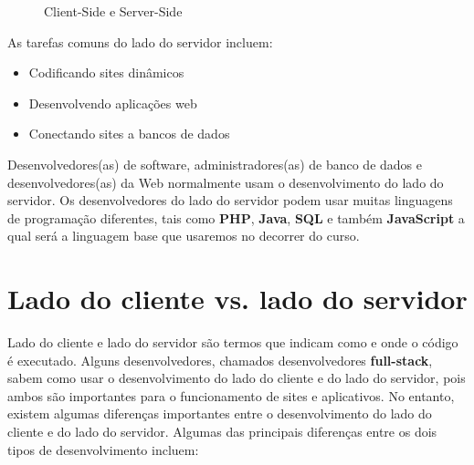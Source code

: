 \begin{figure}[H]
	\centering
	\caption{Client-Side e Server-Side}
\end{figure}

As tarefas comuns do lado do servidor incluem:

\begin{itemize}[leftmargin=1.7cm]
	\setlength\itemsep{0em}
	\item Codificando sites dinâmicos
	\item Desenvolvendo aplicações web
	\item Conectando sites a bancos de dados
\end{itemize}

Desenvolvedores(as) de software, administradores(as) de banco de dados e desenvolvedores(as) da Web normalmente usam o desenvolvimento do lado do servidor. Os desenvolvedores do lado do servidor podem usar muitas linguagens de programação diferentes, tais como \textbf{PHP}, \textbf{Java}, \textbf{SQL} e também \textbf{JavaScript} a qual será a linguagem base que usaremos no decorrer do curso.

\section{Lado do cliente vs. lado do servidor}

Lado do cliente e lado do servidor são termos que indicam como e onde o código é executado. Alguns desenvolvedores, chamados desenvolvedores \textbf{full-stack}, sabem como usar o desenvolvimento do lado do cliente e do lado do servidor, pois ambos são importantes para o funcionamento de sites e aplicativos. No entanto, existem algumas diferenças importantes entre o desenvolvimento do lado do cliente e do lado do servidor. Algumas das principais diferenças entre os dois tipos de desenvolvimento incluem:

